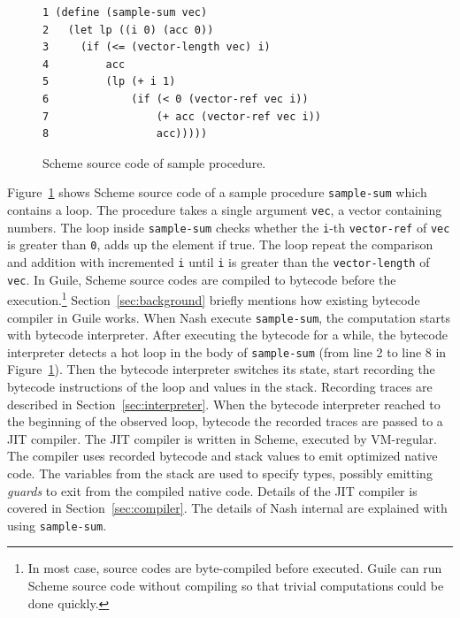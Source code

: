 \documentclass[preprint]{sigplanconf}
\begin{document}
\begin{figure}
  \begin{center}
\begin{verbatim}
1 (define (sample-sum vec)
2   (let lp ((i 0) (acc 0))
3     (if (<= (vector-length vec) i)
4         acc
5         (lp (+ i 1)
6             (if (< 0 (vector-ref vec i))
7                 (+ acc (vector-ref vec i))
8                 acc)))))
\end{verbatim}
\end{center}
\caption{Scheme source code of sample procedure.}
\label{fig:scmloop}
\end{figure}

Figure~\hyperref[fig:scmloop]{\ref{fig:scmloop}} shows Scheme source code of a
sample procedure \texttt{sample-sum} which contains a loop. The procedure
takes a single argument \texttt{vec}, a vector containing numbers. The loop
inside \texttt{sample-sum} checks whether the \texttt{i}-th
\texttt{vector-ref} of \texttt{vec} is greater than \texttt{0}, adds up the
element if true. The loop repeat the comparison and addition with incremented
\texttt{i} until \texttt{i} is greater than the \texttt{vector-length} of
\texttt{vec}. In Guile, Scheme source codes are compiled to bytecode before
the execution.\footnote{In most case, source codes are byte-compiled before
  executed. Guile can run Scheme source code without compiling so that trivial
  computations could be done quickly.}
Section~\hyperref[sec:background]{\ref{sec:background}} briefly mentions how
existing bytecode compiler in Guile works. When Nash execute
\texttt{sample-sum}, the computation starts with bytecode interpreter. After
executing the bytecode for a while, the bytecode interpreter detects a hot
loop in the body of \texttt{sample-sum} (from line 2 to line 8 in
Figure~\hyperref[fig:scmloop]{\ref{fig:scmloop}}). Then the bytecode
interpreter switches its state, start recording the bytecode instructions of
the loop and values in the stack. Recording traces are described in
Section~\hyperref[sec:interpreter]{\ref{sec:interpreter}}. When the bytecode
interpreter reached to the beginning of the observed loop, bytecode the
recorded traces are passed to a JIT compiler. The JIT compiler is written in
Scheme, executed by VM-regular. The compiler uses recorded bytecode and stack
values to emit optimized native code. The variables from the stack are used to
specify types, possibly emitting \textit{guards} to exit from the compiled
native code. Details of the JIT compiler is covered in
Section~\hyperref[sec:compiler]{\ref{sec:compiler}}. The details of Nash
internal are explained with using \texttt{sample-sum}.
\end{document}
